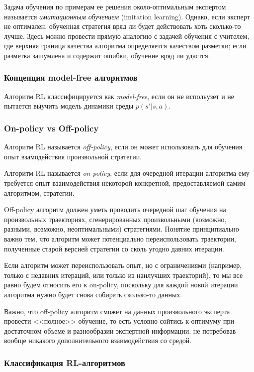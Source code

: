 \documentclass[%
	11pt,
	a4paper,
	utf8,
		]{article}
\begin{document}
Задача обучения по примерам ее решения около-оптимальным экспертом называется \emph{имитационным обучением} (imitation learning). Однако, если эксперт не оптимален, обученная стратегия вряд ли будет действовать хоть сколько-то лучше. Здесь можно провести прямую аналогию с задачей обучения с учителем, где верхняя граница качества алгоритма определяется качеством разметки; если разметка зашумлена и содержит ошибки, обучение вряд ли удастся.

\subsubsection{Концепция model-free алгоритмов}

Алгоритм RL классифицируется как \emph{model-free}, если он не испольузет и не пытается выучить модель динамики среды $ p(s' | s, a) $.

\subsubsection{On-policy vs Off-policy}

Алгоритм RL называется \emph{off-policy}, если он может использовать для обучения опыт взамодействия произвольной стратегии.

Алгоритм RL называется \emph{on-policy}, если для очередной итерации алгоритма ему требуется опыт взаимодействия некоторой конкретной, предоставляемой самим алгоритмом, стратегии.

Off-policy алгоритм должен уметь проводить очередной шаг обучения на произвольных траекториях, сгенерированных произвольными (возможно, разными, возможно, неоптимальными) стратегиями. Понятие принципиально важно тем, что алгоритм может потенциально переиспользовать траектории, полученные старой версией стратегии со сколь угодно давних итерации.

Если алгоритм может переиспользовать опыт, но с ограничениями (например, только с недавних итераций, или только из наилучших траекторий), то мы все равно будем относить его к on-policy, поскольку для каждой новой итерации алгоритма нужно будет снова собирать сколько-то данных. 

Важно, что off-policy алгоритм сможет на данных произвольного эксперта провести <<полное>> обучение, то есть условно сойтись к оптимуму при достаточном объеме и разнообразии экспертной информации, не потребовав вообще никакого дополнительного взаимодействия со средой.

\subsubsection{Классификация RL-алгоритмов}
\end{document}
